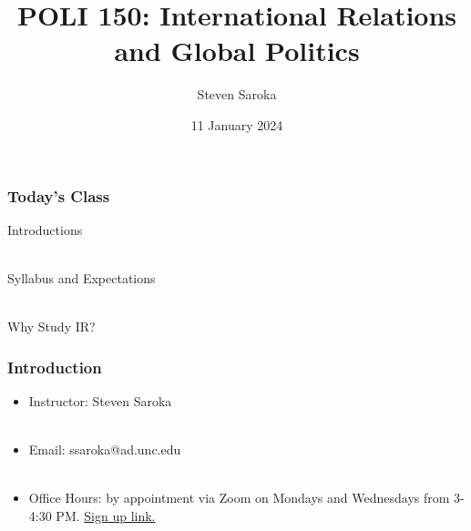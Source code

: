 \documentclass[handout]{beamer}
\title[Introduction]{\LARGE{POLI 150: International Relations and Global Politics}}
\author[POLI 150]{Steven Saroka}
\institute{POLI 150}
\date{11 January 2024}
\begin{document}
\begin{frame}
\titlepage %
\end{frame}






\begin{frame} 
	\frametitle{\LARGE{Today's Class}}
	\begin{itemize}
		\Large{
			\item Introductions
			\\~\\ 
			\item Syllabus and Expectations
			\\~\\
			\item Why Study IR? 
			}
	\end{itemize}
\end{frame}

\begin{frame} 
	\frametitle{\LARGE{Introduction}}
	\begin{itemize}
		\item Instructor: Steven Saroka
		\\~\\
		\item Email: ssaroka@ad.unc.edu
		\\~\\
		\item Office Hours: by appointment via Zoom on Mondays and Wednesdays from 3-4:30 PM. \href{https://www.signupgenius.com/go/10C0F48AFAD29A6FDCF8-47020746-poli\#/}{Sign up link.}
	\end{itemize}
\end{frame}
\end{document}
